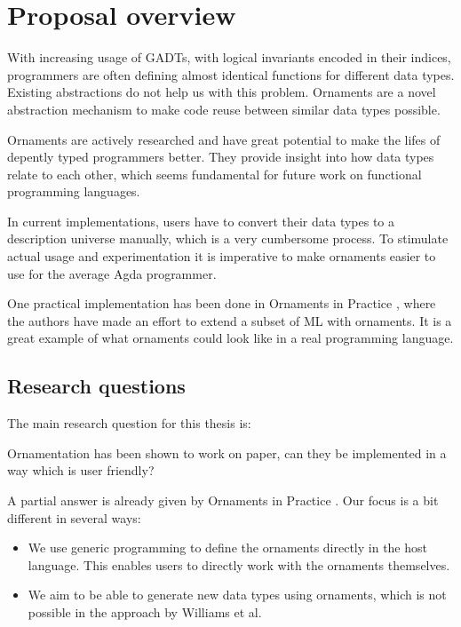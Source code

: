 \section{Proposal overview}\label{sec:proposal-overview}

With increasing usage of GADTs, with logical invariants encoded in
their indices, programmers are often defining almost identical
functions for different data types.
Existing abstractions do not help us with this problem.
Ornaments are a novel abstraction mechanism to make code reuse between
similar data types possible.

Ornaments are actively researched \cite{mcbride11, dagand12,
  kogibbons13, dagand14-essence, dagand14-transporting, williams14}
and have great potential to make the lifes of depently typed
programmers better.
They provide insight into how data types relate to each other, which
seems fundamental for future work on functional programming languages.

In current implementations, users have to convert their data types to
a description universe manually, which is a very cumbersome process.
To stimulate actual usage and experimentation it is imperative to make
ornaments easier to use for the average Agda programmer.

One practical implementation has been done in Ornaments in Practice
\cite{williams14}, where the authors have made an effort to extend a
subset of ML with ornaments.
It is a great example of what ornaments could look like in a real
programming language.

\subsection{Research questions}

The main research question for this thesis is:

\begin{shaded}
Ornamentation has been shown to work on paper, can they be implemented
in a way which is user friendly?
\end{shaded}

A partial answer is already given by Ornaments in Practice
\cite{williams14}.
Our focus is a bit different in several ways:

\begin{itemize}
\item We use generic programming to define the ornaments directly in
  the host language.
  This enables users to directly work with the ornaments themselves.
\item We aim to be able to generate new data types using ornaments,
  which is not possible in the approach by Williams et al.
\end{itemize}

